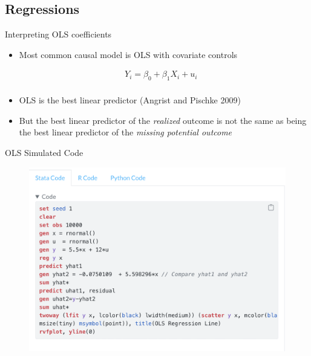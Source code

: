 \documentclass{beamer}
\begin{document}
\subsection{Regressions}



\begin{frame}{Interpreting OLS coefficients}

\begin{itemize}
\item Most common causal model is OLS with covariate controls 


		\begin{align*}
		Y_i = \beta_0 + \beta_1 X_i + u_i&\\
		\end{align*}

\item OLS is the best linear predictor (Angrist and Pischke 2009)
\item But the best linear predictor of the \emph{realized} outcome is not the same as being the best linear predictor of the \emph{missing potential outcome}

\end{itemize}

\end{frame}



\begin{frame}{OLS Simulated Code}

\begin{figure}[!t]\centering
\includegraphics[scale=0.40]{./lecture_includes/ols_code}
\end{figure}

\end{frame}
\end{document}
